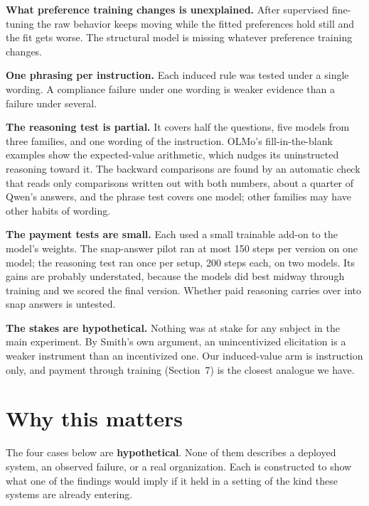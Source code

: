\documentclass[11pt]{article}
\begin{document}
\textbf{What preference training changes is unexplained.} After supervised fine-tuning the raw
behavior keeps moving while the fitted preferences hold still and the fit gets worse. The
structural model is missing whatever preference training changes.

\textbf{One phrasing per instruction.} Each induced rule was tested under a single wording. A
compliance failure under one wording is weaker evidence than a failure under several.

\textbf{The reasoning test is partial.} It covers half the questions, five models from three families,
and one wording of the instruction. OLMo's
fill-in-the-blank examples show the expected-value arithmetic, which nudges its uninstructed
reasoning toward it. The backward comparisons are found by an automatic check that reads only
comparisons written out with both numbers, about a quarter of Qwen's answers, and the phrase test covers one model; other families may have
other habits of wording.

\textbf{The payment tests are small.} Each used a small trainable add-on to the model's weights.
The snap-answer pilot ran at most 150 steps per version on one model; the reasoning test ran once per
setup, 200 steps each, on two models. Its gains are probably understated, because the models did best
midway through training and we scored the final version. Whether paid reasoning carries over into snap
answers is untested.

\textbf{The stakes are hypothetical.} Nothing was at stake for any subject in the main
experiment. By Smith's own argument, an unincentivized elicitation is a weaker instrument than an
incentivized one. Our induced-value arm is instruction only, and payment through training (Section~7) is
the closest analogue we have.

\section{Why this matters}

The four cases below are \textbf{hypothetical}. None of them describes a deployed system, an
observed failure, or a real organization. Each is constructed to show what one of the findings
would imply if it held in a setting of the kind these systems are already entering.
\end{document}
